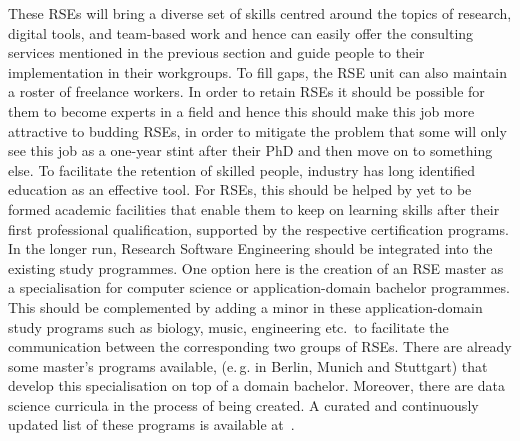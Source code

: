 \documentclass[a4paper]{article}
\makeatletter
\newcommand*{\eg}{e.\,g.\@\xspace}
\makeatother
\begin{document}
These RSEs will bring a diverse set of skills centred around the topics of research,
digital tools, and team-based work and hence can easily offer the consulting services mentioned in the previous section and guide people to their implementation in their workgroups.
To fill gaps, the RSE unit can also maintain a roster of freelance workers.
In order to retain RSEs it should be possible for them to become experts in a field and hence this should make this job more attractive to budding RSEs,
in order to mitigate the problem that some will only see this job as a one-year stint after their PhD and then move on to something else.
To facilitate the retention of skilled people, industry has long identified education as an effective tool.
For RSEs, this should be helped by yet to be formed academic facilities that enable them to keep on learning skills after their first professional qualification, supported by the respective certification programs.
In the longer run, Research Software Engineering should be integrated into the existing study programmes.
One option here is the creation of an RSE master as a specialisation for computer science or application-domain bachelor programmes.
This should be complemented by adding a minor in these application-domain study programs such as biology, music, engineering etc.\ to facilitate the communication between the corresponding two groups of RSEs.
There are already some master's programs available, (\eg{} in Berlin, Munich and Stuttgart) that develop this specialisation on top of a domain bachelor.
Moreover, there are data science curricula in the process of being created.
A curated and continuously updated list of these programs is available at~\cite{learnandteachlearn}.


\printbibliography[heading=bibintoc]
\end{document}

